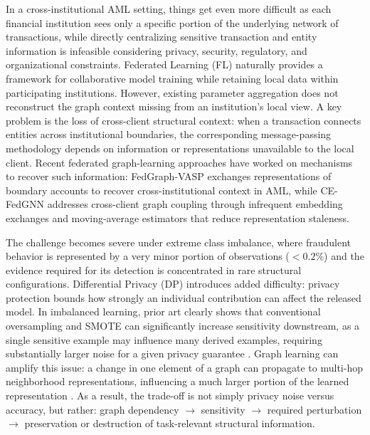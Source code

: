 \documentclass[conference]{IEEEtran}
\begin{document}
In a cross-institutional AML setting, things get even more difficult as each financial institution sees only a specific portion of the underlying network of transactions, while directly centralizing sensitive transaction and entity information is infeasible considering privacy, security, regulatory, and organizational constraints. Federated Learning (FL) naturally provides a framework for collaborative model training while retaining local data within participating institutions. However, existing parameter aggregation does not reconstruct the graph context missing from an institution's local view. A key problem is the loss of cross-client structural context: when a transaction connects entities across institutional boundaries, the corresponding message-passing methodology depends on information or representations unavailable to the local client. Recent federated graph-learning approaches have worked on mechanisms to recover such information: FedGraph-VASP \cite{b2} exchanges representations of boundary accounts to recover cross-institutional context in AML, while CE-FedGNN \cite{b3} addresses cross-client graph coupling through infrequent embedding exchanges and moving-average estimators that reduce representation staleness.

The challenge becomes severe under extreme class imbalance, where fraudulent behavior is represented by a very minor portion of observations ($< 0.2\%$) and the evidence required for its detection is concentrated in rare structural configurations. Differential Privacy (DP) introduces added difficulty: privacy protection bounds how strongly an individual contribution can affect the released model. In imbalanced learning, prior art clearly shows that conventional oversampling and SMOTE can significantly increase sensitivity downstream, as a single sensitive example may influence many derived examples, requiring substantially larger noise for a given privacy guarantee \cite{b4}. Graph learning can amplify this issue: a change in one element of a graph can propagate to multi-hop neighborhood representations, influencing a much larger portion of the learned representation \cite{b5}. As a result, the trade-off is not simply privacy noise versus accuracy, but rather: graph dependency $\rightarrow$ sensitivity $\rightarrow$ required perturbation $\rightarrow$ preservation or destruction of task-relevant structural information.
\end{document}
